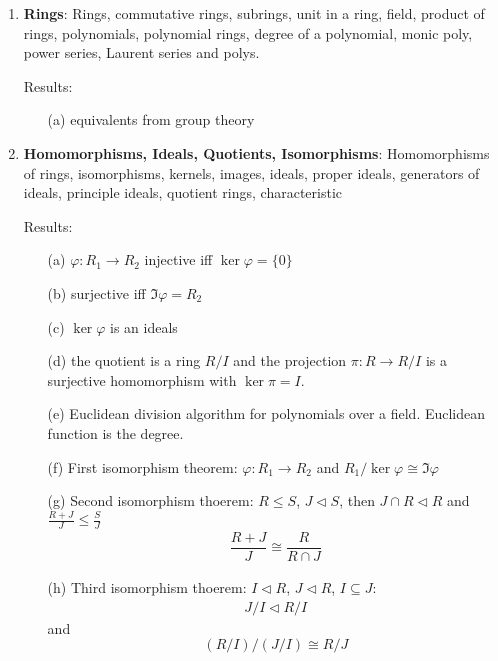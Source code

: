 \documentclass{article}
\begin{document}
\begin{enumerate}
	\item \textbf{Rings}: Rings, commutative rings, subrings, unit in a ring, field, product of rings, polynomials, polynomial rings, degree of a polynomial, monic poly, power series, Laurent series and polys.

	Results:
	\begin{enumerate}
		\item [(a)] equivalents from group theory
	\end{enumerate}

	\item \textbf{Homomorphisms, Ideals, Quotients, Isomorphisms}: Homomorphisms of rings, isomorphisms, kernels, images, ideals, proper ideals, generators of ideals, principle ideals, quotient rings, characteristic

	Results:
	\begin{enumerate}
		\item [(a)] $\varphi : R_{1} \rightarrow R_{2}$ injective iff $\ker{\varphi} = \{0\}$

		\item [(b)] surjective iff $\Im{\varphi} = R_{2}$

		\item [(c)] $\ker{\varphi}$ is an ideals

		\item [(d)] the quotient is a ring $R/I$ and the projection $\pi : R \rightarrow R/I$ is a surjective homomorphism with $\ker{\pi} = I$.

		\item [(e)] Euclidean division algorithm for polynomials over a field. Euclidean function is the degree.

		\item [(f)] First isomorphism theorem: $\varphi : R_{1} \rightarrow R_{2}$ and $R_{1}/\ker{\varphi} \cong \Im{\varphi}$

		\item [(g)] Second isomorphism thoerem: $R \leq S$, $J \triangleleft S$, then $J \cap R \triangleleft R$ and $ \frac{R + J}{J} \leq \frac{S}{J}$
			\begin{align*}
				\dfrac{R + J}{J} \cong \dfrac{R}{ R \cap J}
			\end{align*}
		\item [(h)] Third isomorphism thoerem: $I \triangleleft R$, $J \triangleleft R$, $I \subseteq J$:
			\begin{align*}
				J/I \triangleleft R/I
			\end{align*}
			and 
			\begin{equation*}
				(R / I )/(J /I) \cong R/J
			\end{equation*}
	\end{enumerate} 


\end{enumerate}
\end{document}

